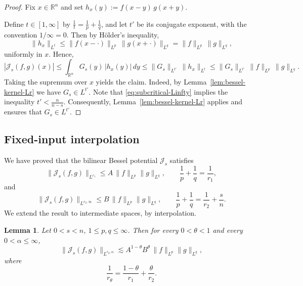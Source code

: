 \documentclass[12pt]{article}
\newtheorem{lemma}[theorem]{Lemma}
\theoremstyle{definition}
\theoremstyle{remark}
\numberwithin{equation}{section}
\begin{document}
\begin{proof}
Fix $x\in\mathbb R^n$ and set
$h_x(y):=f(x-y)\,g(x+y)$.

Define $t\in[1,\infty]$ by $\frac1t=\frac1p+\frac1q$,
and let $t'$ be its conjugate exponent, with the convention $1/\infty=0$. 
Then by Hölder's inequality,
\[
\|h_x\|_{L^t}
\le \|f(x-\cdot)\|_{L^p}\,\|g(x+\cdot)\|_{L^q}
=\|f\|_{L^p}\,\|g\|_{L^q},
\]
uniformly in $x$. Hence,
\[
|\mathcal J_s(f,g)(x)|
\le \int_{\mathbb R^n} G_s(y)\,|h_x(y)|\,dy
\le \|G_s\|_{L^{t'}}\,\|h_x\|_{L^t}
\le \|G_s\|_{L^{t'}}\,\|f\|_{L^p}\,\|g\|_{L^q}.
\]
Taking the supremum over $x$ yields the claim. Indeed, by
Lemma~\ref{lem:bessel-kernel-Lr} we have $G_s \in L^{t'}$.
Note that \eqref{eq:subcritical-Linfty} implies the inequality
$t' < \frac{n}{n-s}$.
Consequently, Lemma~\ref{lem:bessel-kernel-Lr} applies and ensures that
$G_s \in L^{t'}$.
\end{proof}



\subsection{Fixed-input interpolation}
We have proved that the bilinear Bessel potential $\mathcal J_s$ satisfies
\[
\|\mathcal J_s(f,g)\|_{L^{r_1}}
\le A\,\|f\|_{L^p}\|g\|_{L^q},\qquad\frac{1}{p}+\frac{1}{q}=\frac{1}{r_1},
\]
and
\[
\|\mathcal J_s(f,g)\|_{L^{r_2,\infty}}
\le B\,\|f\|_{L^p}\|g\|_{L^q},\qquad\frac{1}{p}+\frac{1}{q}=\frac{1}{r_2}+\frac{s}{n}.
\] 
We extend the result to intermediate spaces, by interpolation.
\begin{lemma}
\label{lem:interp-LPLQ}
Let $0<s<n$, $1\le p,q\le\infty$.
Then for every $0<\theta<1$ and every $0<\alpha\le\infty$,
\[
\|\mathcal J_s(f,g)\|_{L^{r_\theta,\alpha}}
\lesssim
A^{1-\theta}B^\theta\,\|f\|_{L^p}\|g\|_{L^q},
\]
where
\[
\frac1{r_\theta}
=
\frac{1-\theta}{r_1}
+
\frac{\theta}{r_2}.
\]
\end{lemma}
\end{document}

